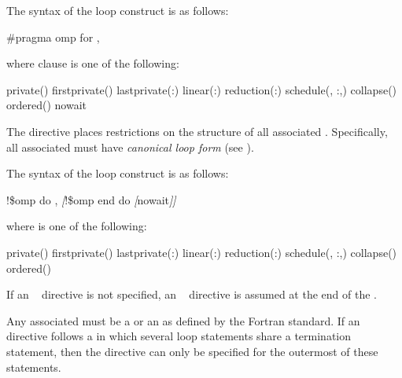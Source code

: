 \syntax
\ccppspecificstart
The syntax of the loop construct is as follows:

\begin{boxedcode}
\#pragma omp for \plc{[clause[ [},\plc{] clause] ... ] new-line} 
\end{boxedcode}

where clause is one of the following: 

\begin{indentedcodelist}
private()
firstprivate()
lastprivate(\plc{[ lastprivate-modifier}:\plc{] list})
linear(\plc{list[ }:\plc{ linear-step]})
reduction(:)
schedule(\plc{[modifier [}, \plc{modifier]}:\plc{]kind[},\plc{ chunk\_size]})
collapse()
ordered\plc{[}()\plc{]}
nowait
\end{indentedcodelist}

The  directive places restrictions on the structure of all associated . 
Specifically, all associated  must have \emph{canonical loop form} (see 
).
\ccppspecificend

\fortranspecificstart
The syntax of the loop construct is as follows:

\begin{boxedcode}
!\$omp do \plc{[clause[ [},\plc{] clause] ... ]}
\textsl{[}!\$omp end do \textsl{[}nowait\textsl{]]}
\end{boxedcode}

where  is one of the following:

\begin{indentedcodelist}
private()
firstprivate()
lastprivate(\plc{[ lastprivate-modifier}:\plc{] list})
linear(\plc{list[ }:\plc{ linear-step]})
reduction(:)
schedule(\plc{[modifier [}, \plc{modifier]}:\plc{]kind[},\plc{ chunk\_size]})
collapse()
ordered\plc{[}()\plc{]}
\end{indentedcodelist}

If an ~ directive is not specified, an ~ directive is assumed at the end of the 
.

Any associated  must be a  or an
 as defined by the Fortran standard. If
an ~ directive follows a  in
which several loop statements share a  termination statement,
then the directive can only be specified for the outermost of these
 statements.

